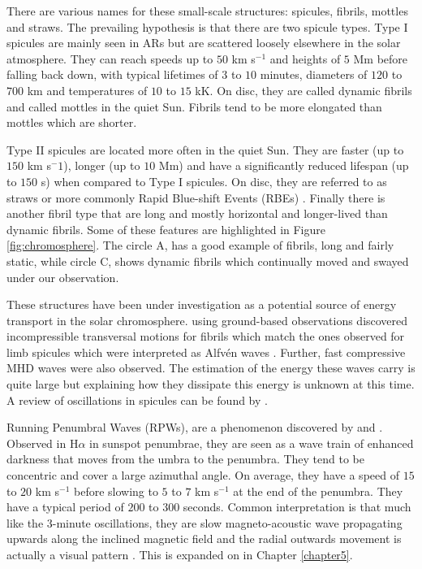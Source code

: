     There are various names for these small-scale structures: spicules, fibrils, mottles and straws.
    The prevailing hypothesis is that there are two spicule types.
    Type I spicules are mainly seen in ARs but are scattered loosely elsewhere in the solar atmosphere.
    They can reach speeds up to $50$ km s$^{-1}$ and heights of $5$ Mm before falling back down, with typical lifetimes of $3$ to $10$ minutes, diameters of $120$ to $700$ km and temperatures of $10$ to $15$ kK.
    On disc, they are called dynamic fibrils and called mottles in the quiet Sun.
    Fibrils tend to be more elongated than mottles which are shorter.
    
    Type II spicules are located more often in the quiet Sun.
    They are faster (up to $150$ km s$^-1$), longer (up to $10$ Mm) and have a significantly reduced lifespan (up to $150$ s) when compared to Type I spicules.
    On disc, they are referred to as straws or more commonly Rapid Blue-shift Events (RBEs) \citep{Zaqarashvili2009}.
    Finally there is another fibril type that are long and mostly horizontal and longer-lived than dynamic fibrils.
    Some of these features are highlighted in Figure \ref{fig:chromosphere}.
    The circle A, has a good example of fibrils, long and fairly static, while circle C, shows dynamic fibrils which continually moved and swayed under our observation.
    
    These structures have been under investigation as a potential source of energy transport in the solar chromosphere.
    \cite{Morton2012} using ground-based observations discovered incompressible transversal motions for fibrils which match the ones observed for limb spicules which were interpreted as Alfv\'en waves \citep{DePontieu2007}.
    Further, fast compressive MHD waves were also observed.
    The estimation of the energy these waves carry is quite large but explaining how they dissipate this energy is unknown at this time.
    A review of oscillations in spicules can be found by \cite{Zaqarashvili2009}. 
      
    Running Penumbral Waves (RPWs), are a phenomenon discovered by \cite{Zirin1972} and \cite{Giovanelli1972}. 
    Observed in H$\alpha$ in sunspot penumbrae, they are seen as a wave train of enhanced darkness that moves from the umbra to the penumbra.
    They tend to be concentric and cover a large azimuthal angle.
    On average, they have a speed of $15$ to $20$ km s$^{-1}$ before slowing to $5$ to $7$ km s$^{-1}$ at the end of the penumbra.
    They have a typical period of $200$ to $300$ seconds. 
    Common interpretation is that much like the $3$-minute oscillations, they are slow magneto-acoustic wave propagating upwards along the inclined magnetic field and the radial outwards movement is actually a visual pattern \citep{UTMO,ORWS,OASO}.
    This is expanded on in Chapter \ref{chapter5}.
    
